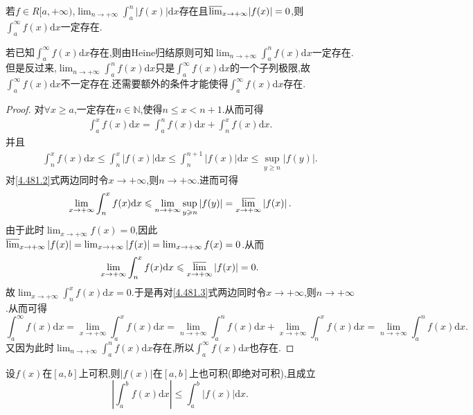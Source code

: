 \documentclass[../../main.tex]{subfiles}
\begin{document}
\begin{proposition}\label{proposition:反常积分与其子列极限存在命题}
若\(f\in R[a, +\infty)\),\(\lim_{n\rightarrow +\infty}\int_a^n|f(x)|\mathrm{d}x\)存在且\({\varlimsup_{x\rightarrow +\infty}}|f(x)| = 0\),则\(\int_a^{\infty}f(x)\mathrm{d}x\)一定存在.
\end{proposition}
\begin{note}
若已知$\int_a^{\infty}f(x)\mathrm{d}x$存在,则由Heine归结原则可知\(\lim_{n\rightarrow +\infty}\int_a^n f(x)\mathrm{d}x\)一定存在.但是反过来,\(\lim_{n\rightarrow +\infty}\int_a^n f(x)\mathrm{d}x\)只是$\int_a^{\infty}f(x)\mathrm{d}x$的一个子列极限,故$\int_a^{\infty}f(x)\mathrm{d}x$不一定存在.还需要额外的条件才能使得$\int_a^{\infty}f(x)\mathrm{d}x$存在.
\end{note}
\begin{proof}
对\(\forall x\geqslant a\),一定存在\(n\in\mathbb{N}\),使得\(n\leqslant x < n + 1\).从而可得
\begin{align}\label{4.481.3}
\int_a^x f(x)\mathrm{d}x=\int_a^n f(x)\mathrm{d}x+\int_n^x f(x)\mathrm{d}x. 
\end{align}
并且
\begin{align}\label{4.481.2}
\int_n^x f(x)\mathrm{d}x\leqslant\int_n^x\left|f(x)\right|\mathrm{d}x\leqslant\int_n^{n + 1}\left|f(x)\right|\mathrm{d}x\leqslant\sup_{y\geqslant n}\left|f(y)\right|.
\end{align}
对\eqref{4.481.2}式两边同时令\(x\rightarrow +\infty\),则\(n\rightarrow +\infty\).进而可得
\[
\lim_{x\rightarrow +\infty}\int_n^x f(x)\mathrm{d}x\leqslant\lim_{n\rightarrow +\infty}\sup_{y\geqslant n}\left|f(y)\right|={\varlimsup_{x\rightarrow +\infty}}\left|f(x)\right|.
\]
由于此时\(\lim_{x\rightarrow +\infty}f(x)=0\),因此\({\varlimsup_{x\rightarrow +\infty}}\left|f(x)\right|=\lim_{x\rightarrow +\infty}\left|f(x)\right|=\lim_{x\rightarrow +\infty}f(x)=0\).从而
\[
\lim_{x\rightarrow +\infty}\int_n^x f(x)\mathrm{d}x\leqslant{\varlimsup_{x\rightarrow +\infty}}\left|f(x)\right|=0.
\]
故\(\lim_{x\rightarrow +\infty}\int_n^x f(x)\mathrm{d}x = 0\).于是再对\eqref{4.481.3}式两边同时令\(x\rightarrow +\infty\),则\(n\rightarrow +\infty\).从而可得
\[
\int_a^{\infty}f(x)\mathrm{d}x=\lim_{x\rightarrow +\infty}\int_a^x f(x)\mathrm{d}x=\lim_{n\rightarrow +\infty}\int_a^n f(x)\mathrm{d}x+\lim_{x\rightarrow +\infty}\int_n^x f(x)\mathrm{d}x=\lim_{n\rightarrow +\infty}\int_a^n f(x)\mathrm{d}x.
\]
又因为此时\(\lim_{n\rightarrow +\infty}\int_a^n f(x)\mathrm{d}x\)存在,所以\(\int_a^{\infty}f(x)\mathrm{d}x\)也存在.
\end{proof}

\begin{theorem}
设\(f(x)\)在\([a,b]\)上可积,则\(\vert f(x)\vert\)在\([a,b]\)上也可积(即绝对可积),且成立
\[
\left|\int_{a}^{b}f(x)\mathrm{d}x\right|\leq\int_{a}^{b}\vert f(x)\vert \mathrm{d}x.
\]
\end{theorem}
\end{document}
